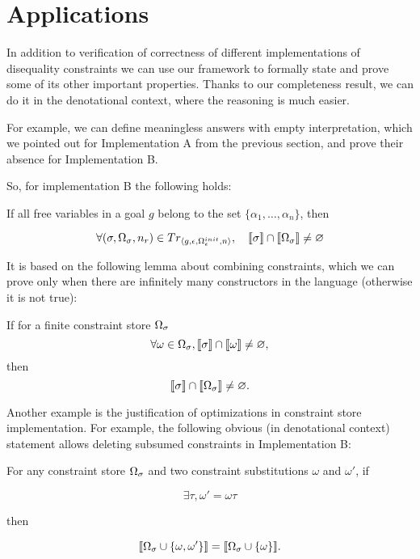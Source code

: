 \section{Applications}

In addition to verification of correctness of different implementations of disequality constraints we can use our framework to formally
state and prove some of its other important properties. Thanks to our completeness result, we can do it in the denotational context,
where the reasoning is much easier.

For example, we can define meaningless answers with empty interpretation, which we pointed out for Implementation A from the previous section,
and prove their absence for Implementation B.

So, for implementation B the following holds:

\begin{lemma}
If all free variables in a goal $g$ belong to the set $\{\alpha_1,\dots,\alpha_n\}$, then

\[ \forall (\sigma, \Omega_\sigma, n_r) \in Tr_{\left<{g, \epsilon, \Omega_\epsilon^{init}, n}\right>}, \quad \llbracket{\sigma}\rrbracket \cap \llbracket{\Omega_\sigma}\rrbracket \neq \varnothing \]
\end{lemma}

It is based on the following lemma about combining constraints, which we can prove only when there are infinitely many constructors in the language (otherwise it is not true):

\begin{lemma}
If for a finite constraint store $\Omega_\sigma$
\[ \forall \omega \in \Omega_\sigma,  \llbracket{\sigma}\rrbracket \cap \llbracket{\omega}\rrbracket \neq \varnothing, \]
then
\[ \llbracket{\sigma}\rrbracket \cap \llbracket{\Omega_\sigma}\rrbracket \neq \varnothing. \]
\end{lemma}

Another example is the justification of optimizations in constraint store implementation. For example, the following obvious (in denotational context) statement
allows deleting subsumed constraints in Implementation B:

\begin{lemma}
For any constraint store $\Omega_\sigma$ and two constraint substitutions $\omega$ and $\omega'$, if

\[ \exists \tau, \omega' = \omega \tau \]

then

\[ \llbracket{\Omega_\sigma \cup \{\omega, \omega'\}}\rrbracket = \llbracket{\Omega_\sigma \cup \{\omega\}}\rrbracket. \]
\end{lemma}
